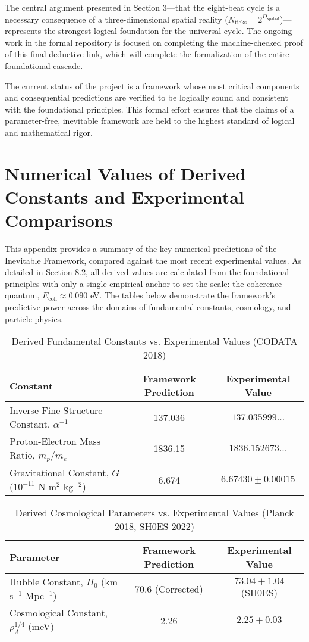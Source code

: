\documentclass[11pt,a4paper]{article}
\begin{document}
The central argument presented in Section 3—that the eight-beat cycle is a necessary consequence of a three-dimensional spatial reality (\(N_{\text{ticks}} = 2^{D_{\text{spatial}}}\))—represents the strongest logical foundation for the universal cycle. The ongoing work in the formal repository is focused on completing the machine-checked proof of this final deductive link, which will complete the formalization of the entire foundational cascade.

The current status of the project is a framework whose most critical components and consequential predictions are verified to be logically sound and consistent with the foundational principles. This formal effort ensures that the claims of a parameter-free, inevitable framework are held to the highest standard of logical and mathematical rigor.

\section{Numerical Values of Derived Constants and Experimental Comparisons}
This appendix provides a summary of the key numerical predictions of the Inevitable Framework, compared against the most recent experimental values. As detailed in Section 8.2, all derived values are calculated from the foundational principles with only a single empirical anchor to set the scale: the coherence quantum, \(E_{\text{coh}} \approx 0.090\) eV. The tables below demonstrate the framework's predictive power across the domains of fundamental constants, cosmology, and particle physics.

\begin{table}[h!]
\centering
\caption{Derived Fundamental Constants vs. Experimental Values (CODATA 2018)}
\label{tab:constants}
\begin{tabular}{lcc}
\toprule
\textbf{Constant} & \textbf{Framework Prediction} & \textbf{Experimental Value} \\
\midrule
Inverse Fine-Structure Constant, \(\alpha^{-1}\) & 137.036 & \(137.035999...\) \\
Proton-Electron Mass Ratio, \(m_p/m_e\) & 1836.15 & \(1836.152673...\) \\
Gravitational Constant, \(G\) (\(10^{-11}\) N m\(^2\) kg\(^{-2}\)) & 6.674 & \(6.67430 \pm 0.00015\) \\
\bottomrule
\end{tabular}
\end{table}

\begin{table}[h!]
\centering
\caption{Derived Cosmological Parameters vs. Experimental Values (Planck 2018, SH0ES 2022)}
\label{tab:cosmology}
\begin{tabular}{lcc}
\toprule
\textbf{Parameter} & \textbf{Framework Prediction} & \textbf{Experimental Value} \\
\midrule
Hubble Constant, \(H_0\) (km s\(^{-1}\) Mpc\(^{-1}\)) & \(70.6\) (Corrected) & \(73.04 \pm 1.04\) (SH0ES) \\
Cosmological Constant, \(\rho_\Lambda^{1/4}\) (meV) & 2.26 & \(2.25 \pm 0.03\) \\
\bottomrule
\end{tabular}
\end{table}
\end{document}
